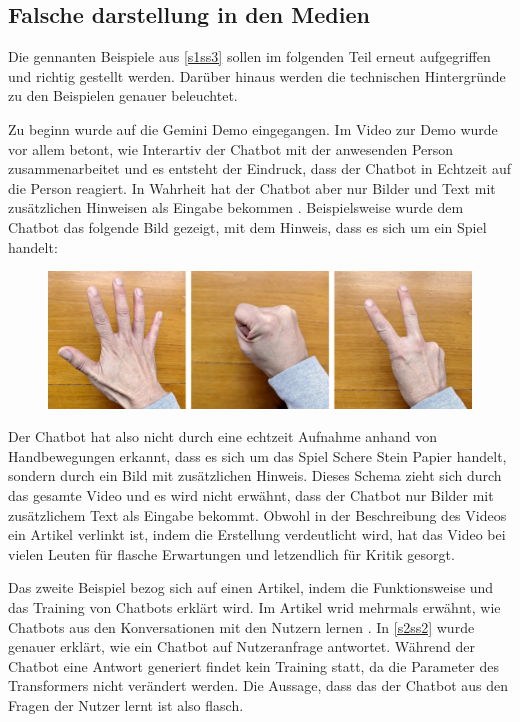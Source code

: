 	\clearpage
	\subsection{Falsche darstellung in den Medien}\label{s3ss2}
	Die gennanten Beispiele aus \ref{s1ss3} sollen im folgenden Teil erneut aufgegriffen und richtig gestellt werden. Darüber
	hinaus werden die technischen Hintergründe zu den Beispielen genauer beleuchtet. 

	Zu beginn wurde auf die Gemini Demo eingegangen. Im Video zur Demo wurde vor allem betont, wie Interartiv der Chatbot mit
	der anwesenden Person zusammenarbeitet und es entsteht der Eindruck, dass der Chatbot in Echtzeit auf die Person reagiert.
	In Wahrheit hat der Chatbot aber nur Bilder und Text mit zusätzlichen Hinweisen als Eingabe bekommen \cite{chenGoogle23}. Beispielsweise wurde
	dem Chatbot das folgende Bild gezeigt, mit dem Hinweis, dass es sich um ein Spiel handelt:
	\begin{figure}[h]
    	\includegraphics[scale=0.25]{assets/hand_rock_paper_scissors.png}
    \end{figure}
	\newline
	Der Chatbot hat also nicht durch eine echtzeit Aufnahme anhand von Handbewegungen erkannt, dass es sich um das Spiel \glqq{}Schere
	Stein Papier\grqq{} handelt, sondern durch ein Bild mit zusätzlichen Hinweis. Dieses Schema zieht sich durch das gesamte Video und
	es wird nicht erwähnt, dass der Chatbot nur Bilder mit zusätzlichem Text als Eingabe bekommt. Obwohl in der Beschreibung des
	Videos ein Artikel verlinkt ist, indem die Erstellung verdeutlicht wird, hat das Video bei vielen Leuten für flasche
	Erwartungen und letzendlich für Kritik gesorgt.

	Das zweite Beispiel bezog sich auf einen Artikel, indem die Funktionsweise und das Training von Chatbots erklärt wird. Im 
	Artikel wrid mehrmals erwähnt, wie Chatbots aus den Konversationen mit den Nutzern lernen \cite{gramsch23}. In \ref{s2ss2} wurde genauer 
	erklärt, wie ein Chatbot auf Nutzeranfrage antwortet. Während der Chatbot eine Antwort generiert findet kein Training statt, da die Parameter
	des Transformers nicht verändert werden. Die Aussage, dass das der Chatbot aus den Fragen der Nutzer lernt ist also flasch.	


